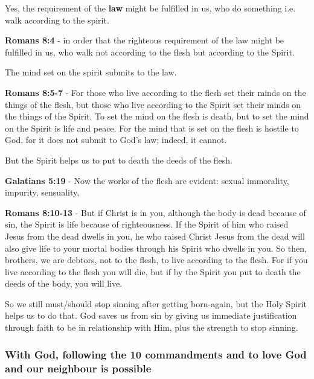 \documentclass[11pt]{article}
\begin{document}
Yes, the requirement of the \textbf{law} might be fulfilled in us, who do something i.e. walk according to the spirit.

\textbf{Romans 8:4} - in order that the righteous requirement of the law might be fulfilled in us, who walk not according to the flesh but according to the Spirit.

The mind set on the spirit submits to the law.

\textbf{Romans 8:5-7} - For those who live according to the flesh set their minds on the things of the flesh, but those who live according to the Spirit set their minds on the things of the Spirit.  To set the mind on the flesh is death, but to set the mind on the Spirit is life and peace.  For the mind that is set on the flesh is hostile to God, for it does not submit to God's law; indeed, it cannot.

But the Spirit helps us to put to death the deeds of the flesh.

\textbf{Galatians 5:19} - Now the works of the flesh are evident: sexual immorality, impurity, sensuality,

\textbf{Romans 8:10-13} - But if Christ is in you, although the body is dead because of sin, the Spirit is life because of righteousness. If the Spirit of him who raised Jesus from the dead dwells in you, he who raised Christ Jesus from the dead will also give life to your mortal bodies through his Spirit who dwells in you. So then, brothers, we are debtors, not to the flesh, to live according to the flesh. For if you live according to the flesh you will die, but if by the Spirit you put to death the deeds of the body, you will live.

So we still must/should stop sinning after getting born-again, but the Holy Spirit helps us to do that.
God saves us from sin by giving us immediate justification through faith to be in relationship with Him, plus the strength to stop sinning.

\subsubsection{With God, following the 10 commandments and to love God and our neighbour is possible}
\label{sec:orgff367d3}
\end{document}
